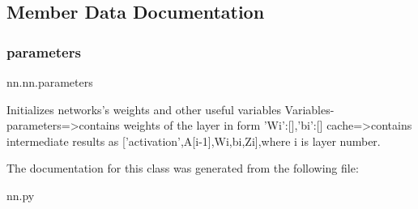 \subsection{Member Data Documentation}
\mbox{\label{classnn_1_1nn_a69da89bd6d17dbc8596ab586b7678237}} 
\subsubsection{\texorpdfstring{parameters}{parameters}}
{\footnotesize\ttfamily nn.\+nn.\+parameters}

\begin{DoxyVerb}Initializes networks's weights and other useful variables
Variables-parameters=>contains weights of the layer in form {'Wi':[],'bi':[]}
  cache=>contains intermediate results as ['activation',A[i-1],Wi,bi,Zi],where i
  is layer number.
\end{DoxyVerb}
 

The documentation for this class was generated from the following file\+:\begin{DoxyCompactItemize}
\item 
nn.\+py\end{DoxyCompactItemize}
